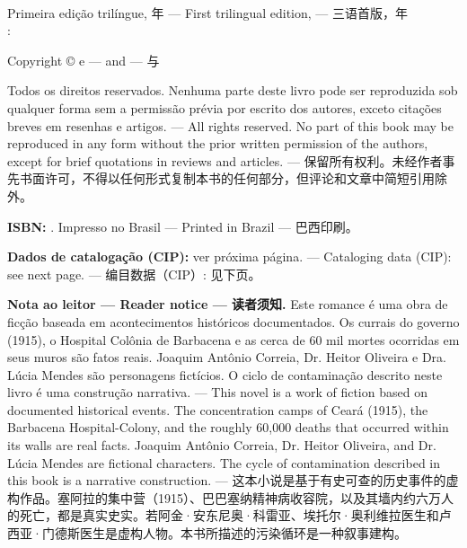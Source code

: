 \cleardoublepage
\thispagestyle{empty}
{\small
\setlength{\parindent}{0em}
\setlength{\parskip}{0.7em}
~
\vspace{0.3em}
\vspace{1em}

Primeira edição trilíngue, \editionyear{}年 --- First trilingual edition, \editionyear{} --- 三语首版，\editionyear{}年\\
\publishercity{}: \publisher{}

Copyright \copyright{} \editionyear{} \authorname{} e \coauthorname{} --- and --- 与

Todos os direitos reservados. Nenhuma parte deste livro pode ser reproduzida sob qualquer forma sem a permissão prévia por escrito dos autores, exceto citações breves em resenhas e artigos. --- All rights reserved. No part of this book may be reproduced in any form without the prior written permission of the authors, except for brief quotations in reviews and articles. --- 保留所有权利。未经作者事先书面许可，不得以任何形式复制本书的任何部分，但评论和文章中简短引用除外。

\textbf{ISBN:} \isbn{}. \quad Impresso no Brasil --- Printed in Brazil --- 巴西印刷。

\textbf{Dados de catalogação (CIP):} ver próxima página. --- Cataloging data (CIP): see next page. --- 编目数据（CIP）: 见下页。

\vspace{0.4em}
{\footnotesize
\textbf{Nota ao leitor --- Reader notice --- 读者须知.} Este romance é uma obra de ficção baseada em acontecimentos históricos documentados. Os currais do governo (1915), o Hospital Colônia de Barbacena e as cerca de 60 mil mortes ocorridas em seus muros são fatos reais. Joaquim Antônio Correia, Dr. Heitor Oliveira e Dra. Lúcia Mendes são personagens fictícios. O ciclo de contaminação descrito neste livro é uma construção narrativa. --- This novel is a work of fiction based on documented historical events. The concentration camps of Ceará (1915), the Barbacena Hospital-Colony, and the roughly 60,000 deaths that occurred within its walls are real facts. Joaquim Antônio Correia, Dr. Heitor Oliveira, and Dr. Lúcia Mendes are fictional characters. The cycle of contamination described in this book is a narrative construction. --- 这本小说是基于有史可查的历史事件的虚构作品。塞阿拉的集中营（1915）、巴巴塞纳精神病收容院，以及其墙内约六万人的死亡，都是真实史实。若阿金·安东尼奥·科雷亚、埃托尔·奥利维拉医生和卢西亚·门德斯医生是虚构人物。本书所描述的污染循环是一种叙事建构。

}}
